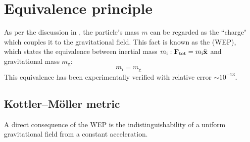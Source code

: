 
\section{Equivalence principle}

As per the discussion in , the particle's mass $ m $ can be regarded as the ``charge" which couples it to the gravitational field. This fact is known as the  (WEP), which states the equivalence between inertial mass $ m_\text{i} : \mathbf{F}_\text{tot} = m_\text{i} \ddot{\mathbf{x}} $ and gravitational mass $ m_\text{g} $:
\begin{equation}
  m_\text{i} = m_\text{g}
\end{equation}
This equivalence has been experimentally verified with relative error $ \sim 10^{-13} $.

\subsection{Kottler--Möller metric}

A direct consequence of the WEP is the indistinguishability of a uniform gravitational field from a constant acceleration.

